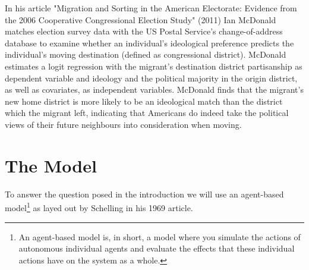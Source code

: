 \documentclass[12pt, a4paper]{article}
\begin{document}
\newline In his article "Migration and Sorting in the American Electorate: Evidence from the 2006 Cooperative Congressional Election Study" (2011) Ian McDonald matches election survey data with the US Postal Service's change-of-address database to examine whether an individual's ideological preference predicts the individual's moving destination (defined as congressional district). McDonald estimates a logit regression with the migrant's destination district partisanship as dependent variable and ideology and the political majority in the origin district, as well as covariates, as independent variables. McDonald finds that the migrant's new home district is more likely to be an ideological match than the district which the migrant left, indicating that Americans do indeed take the political views of their future neighbours into consideration when moving. 

\section{\label{model}The Model}
To answer the question posed in the introduction we will use an agent-based model\footnote{An agent-based model is, in short, a model where you simulate the actions of autonomous individual agents and evaluate the effects that these individual actions have on the system as a whole.} as layed out by Schelling in his 1969 article. 
\end{document}
